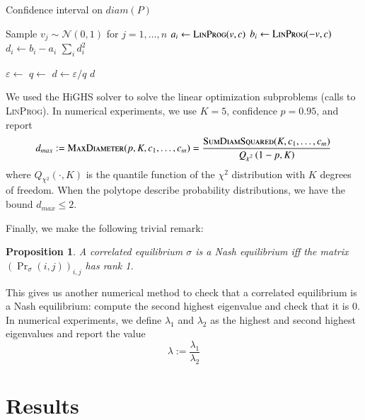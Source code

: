 \documentclass[preprint,12pt,authoryear,doubleblind]{elsarticle}
\newtheorem{proposition}[theorem]{Proposition}
\theoremstyle{definition}
\begin{document}
\begin{algorithm}
\label{alg:diameters}
\caption{Confidence interval on $diam(P)$}
\begin{algorithmic}
    \State Sample $v_j \sim \mathcal{N}(0, 1)$ for $j=1,\ldots,n$
    \State $a_i \gets \textsc{LinProg}(v, c)$ 
    \State $b_i \gets \textsc{LinProg}(-v, c)$ 
    \State $d_i \gets b_i - a_i$
\EndFor
\State \Return $\sum_i d_i^2$
\EndFunction
{}

\State $\varepsilon \gets$ 
\State $q \gets$ 
\State $d \gets \varepsilon / q$
\State \Return $d$
\EndFunction
\end{algorithmic}
\end{algorithm}

We used the HiGHS solver \citep{huangfu2018parallelizing} to solve the linear optimization subproblems (calls to \textsc{LinProg}). In numerical experiments, we use $K=5$, confidence $p=0.95$, and report $$d_{max} :=  \textsc{MaxDiameter}(p, K, c_1, \ldots, c_m) = \frac{\textsc{SumDiamSquared}(K, c_1, \ldots, c_m)} {Q_{\chi^2}\left(1-p, K\right)}$$ where $Q_{\chi^2}(\cdot, K)$ is the quantile function of the $\chi^2$ distribution with $K$ degrees of freedom. When the polytope describe probability distributions, we have the bound $d_{max} \leq 2$.

Finally, we make the following trivial remark:

\begin{proposition}
    A correlated equilibrium $\sigma$ is a Nash equilibrium iff the matrix $(\Pr\nolimits_\sigma(i, j))_{i,j}$ has rank 1.
\end{proposition}

This gives us another numerical method to check that a correlated equilibrium is a Nash equilibrium: compute the second highest eigenvalue and check that it is $0$. In numerical experiments, we define $\lambda_1$ and $\lambda_2$ as the highest and second highest eigenvalues and report the value $$\lambda := \frac{\lambda_1}{\lambda_2}$$



\section{Results}
\end{document}
